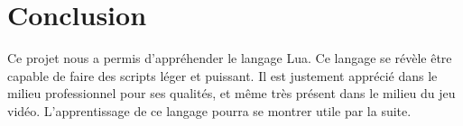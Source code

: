 \documentclass[11pt,a4paper]{article}
\begin{document}
\section{Conclusion}

Ce projet nous a permis d'appréhender le langage Lua. Ce langage se révèle être capable de faire des scripts léger et puissant. Il est justement apprécié dans le milieu professionnel pour ses qualités, et même très présent dans le milieu du jeu vidéo. L'apprentissage de ce langage pourra se montrer utile par la suite.
\end{document}

